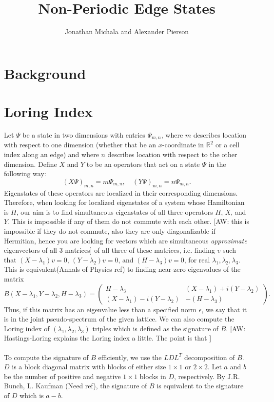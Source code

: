 \documentclass[a4paper]{article}
\title{Non-Periodic Edge States}
\author{Jonathan Michala and Alexander Pierson}
\newcommand{\aw}[1]{{\color{blue} [AW: #1]}}
\begin{document}
\maketitle

\section{Background}
\section{Loring Index}
Let $\Psi$ be a state in two dimensions with entries $\Psi_{m,n}$, where $m$ describes location with respect to one dimension (whether that be an $x$-coordinate in $\mathbb{R}^2$ or a cell index along an edge) and where $n$ describes location with respect to the other dimension.
Define $X$ and $Y$ to be an operators that act on a state $\Psi$ in the following way:
$$(X \Psi)_{m,n} = m\Psi_{m,n}, \quad (Y \Psi)_{m,n} = n\Psi_{m,n}.$$
Eigenstates of these operators are localized in their corresponding dimensions.
Therefore, when looking for localized eigenstates of a system whose Hamiltonian is $H$, our aim is to find simultaneous eigenstates of all three operators $H$, $X$, and $Y$.
This is impossible if any of them do not commute with each other.
 \aw{this is impossible if they do not commute, also they are only diagonalizable if Hermitian, hence you are looking for vectors which are simultaneous \emph{approximate} eigenvectors of all 3 matrices} of all three of these matrices, i.e. finding $v$ such that $(X - \lambda_1)v = 0$, $(Y - \lambda_2)v = 0$, and $(H-\lambda_3)v = 0$, for real $\lambda_1,\lambda_2,\lambda_3$. This is equivalent(Annals of Physics ref) to finding near-zero eigenvalues of the matrix
$$B(X - \lambda_1, Y - \lambda_2, H - \lambda_3) =
\begin{pmatrix}
H - \lambda_3 & (X - \lambda_1) + i(Y - \lambda_2)\\
(X - \lambda_1) - i(Y - \lambda_2) & - (H - \lambda_3)
\end{pmatrix}.$$
Thus, if this matrix has an eigenvalue less than a specified norm $\epsilon$, we say that it is in the joint pseudo-spectrum of the given lattice. We can also compute the Loring index of $(\lambda_1,\lambda_2,\lambda_3)$ triples which is defined as the signature of $B$. \aw{Hastings-Loring explains the Loring index a little. The point is that } \\\\
To compute the signature of $B$ efficiently, we use the $LDL^T$ decomposition of $B$. $D$ is a block diagonal matrix with blocks of either size $1 \times 1$ or $2 \times 2$. Let $a$ and $b$ be the number of positive and negative $1 \times 1$ blocks in $D$, respectively. By J.R. Bunch, L. Kaufman (Need ref), the signature of $B$ is equivalent to the signature of $D$ which is $a - b$.
\end{document}
